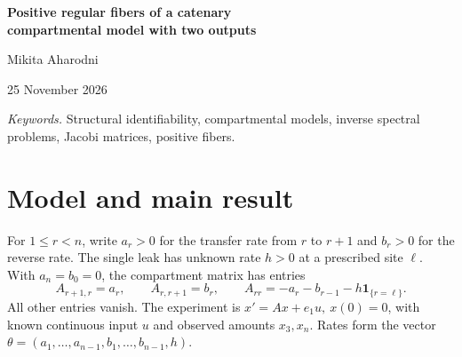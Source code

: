 \documentclass[11pt,a4paper]{article}
\newcommand{\id}{\mathbf 1}
\begin{document}
\thispagestyle{plain}
\begin{center}
{\LARGE\bfseries Positive regular fibers of a catenary\\[3pt] compartmental model with two outputs\par}
\vspace{.7em}
{\large Mikita Aharodni\par}
\vspace{.25em}
{\small 25 November 2026\par}
\end{center}
\begin{abstract}
Consider a bidirected path of \(n\ge4\) compartments with an inlet at the first
compartment, amount measurements at the third and last compartments, and a
single leak at a known site \(\ell\). We determine the maximum number of
positive regular rate vectors consistent with the same two output trajectories.
The maximum is one if the leak is at either measured compartment and two at
every other leak location. The upper bound follows by expressing the distal
gain as a concave minimum on an affine interval of endpoint spectral weights
of a Jacobi matrix. A five-compartment example and two extension operations
give sharpness for interior leaks at every chain length. For a single leak
at the penultimate compartment and \(n\ge5\), the two realizations have
different elimination rates on a nonempty open set of data. With the two
coprime spectral polynomials and the proximal gain fixed, at most one distal
gain admits two regular solutions with the same elimination rate. Such a
pair exists already for \(n=5\).
\end{abstract}
\noindent\textit{Keywords.} Structural identifiability, compartmental models,
inverse spectral problems, Jacobi matrices, positive fibers.

\section{Model and main result}\label{sec:model}
For \(1\le r<n\), write \(a_r>0\) for the transfer rate from \(r\) to \(r+1\)
and \(b_r>0\) for the reverse rate. The single leak has unknown rate \(h>0\)
at a prescribed site \(\ell\). With \(a_n=b_0=0\), the compartment matrix
has entries
\[
 A_{r+1,r}=a_r,\qquad A_{r,r+1}=b_r,\qquad
 A_{rr}=-a_r-b_{r-1}-h\id_{\{r=\ell\}}.
\]
All other entries vanish. The experiment is \(x'=Ax+e_1u,\ x(0)=0\), with
known continuous input \(u\) and observed amounts \(x_3,x_n\). Rates form the
vector \(\theta=(a_1,\ldots,a_{n-1},b_1,\ldots,b_{n-1},h)\).
\end{document}
